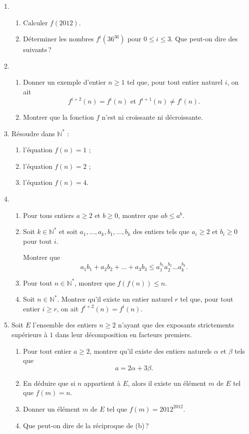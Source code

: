 \documentclass[10pt,a4paper]{article}
\begin{document}
\begin{enumerate}
\item
\begin{enumerate}
\item Calculer $f(2012)$.
\item Déterminer les nombres $f^i(36^{36})$ pour $0\leqslant i \leqslant 3$. Que peut-on dire des suivants\,?
\end{enumerate}
\item
\begin{enumerate}
\item Donner un exemple d'entier $n\geqslant 1$ tel que, pour tout entier naturel $i$, on ait
$$f^{i+2}(n)=f^i(n) \text{ et } f^{i+1}(n)\neq f^i(n).$$
\item Montrer que la fonction $f$ n'est ni croissante ni décroissante.
\end{enumerate}
\item Résoudre dans $\mathbb{N}^*$ :
\begin{enumerate}
\item l'équation $f(n)=1$ ;
\item l'équation $f(n)=2$ ;
\item l'équation $f(n)=4$.
\end{enumerate}
\item
\begin{enumerate}
\item Pour tous entiers $a\geqslant 2$ et $b\geqslant 0$, montrer que $ab\leqslant a^b$.
\item Soit $k\in\mathbb{N}^*$ et soit $a_1,...,a_k,b_1,...,b_k$ des entiers tels que $a_i\geqslant 2$ et $b_i\geqslant 0$ pour tout $i$.

Montrer que
$$a_1b_1+a_2b_2+...+a_3b_3\leqslant a_1^{b_1}a_2^{b_2}...a_k^{b_k}.$$
\item Pour tout $n\in\mathbb{N}^*$, montrer que $f(f(n))\leqslant n$.
\item Soit $n\in\mathbb{N}^*$. Montrer qu'il existe un entier naturel $r$ tel que, pour tout entier $i\geqslant r$, on ait $f^{i+2}(n)=f^i(n)$.
\end{enumerate}
\item Soit $E$ l'ensemble des entiers $n\geqslant 2$ n'ayant que des exposants strictements supérieurs à $1$ dans leur décomposition en facteurs premiers.
\begin{enumerate}
\item Pour tout entier $a\geqslant 2$, montrer qu'il existe des entiers naturels $\alpha$ et $\beta$ tels que 
$$a=2\alpha+3\beta.$$
\item En déduire que si $n$ appartient à $E$, alors il existe un élément $m$ de $E$ tel que $f(m)=n$.
\item Donner un élément $m$ de $E$ tel que $f(m)=2012^{2012}$.
\item Que peut-on dire de la réciproque de (b)\,?
\end{enumerate}
\end{enumerate}
\end{document}
